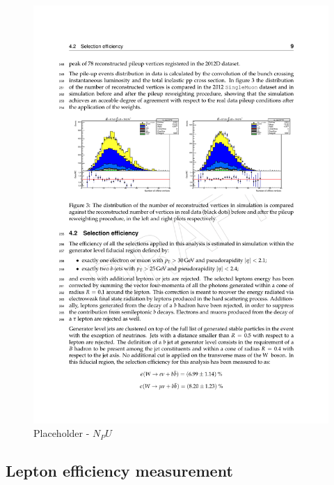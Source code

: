 \begin{figure}[htbp]
	\centering
		\includegraphics[width=\textwidth]{Figures/NPU_placeholder.pdf}
	\caption[Placeholder - PU]{Placeholder - $N_PU$}
	\label{fig:N_pu}
\end{figure} 

\subsection{Lepton efficiency measurement}
\label{sec:lepEff}

